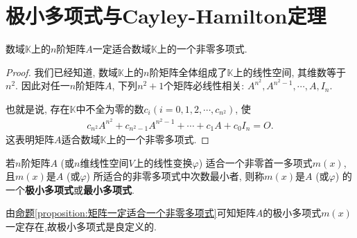 \documentclass[../../main.tex]{subfiles}%
\begin{document}
\section{极小多项式与Cayley-Hamilton定理}

\begin{proposition}\label{proposition:矩阵一定适合一个非零多项式}
数域$\mathbb{K}$上的$n$阶矩阵$A$一定适合数域$\mathbb{K}$上的一个非零多项式.
\end{proposition}
\begin{proof}
我们已经知道, 数域$\mathbb{K}$上的$n$阶矩阵全体组成了$\mathbb{K}$上的线性空间, 其维数等于$n^2$. 因此对任一$n$阶矩阵$A$, 下列$n^2 + 1$个矩阵必线性相关:
$A^{n^2}, A^{n^2-1}, \cdots, A, I_n$.

也就是说, 存在$\mathbb{K}$中不全为零的数$c_i (i = 0, 1, 2, \cdots, c_{n^2})$, 使
\begin{align*}
c_{n^2}A^{n^2} + c_{n^2-1}A^{n^2-1} + \cdots + c_1A + c_0I_n = O.
\end{align*}
这表明矩阵$A$适合数域$\mathbb{K}$上的一个非零多项式.
\end{proof}

\begin{definition}[矩阵的极小多项式]
若$n$阶矩阵$A$ (或$n$维线性空间$V$上的线性变换$\varphi$) 适合一个非零首一多项式$m(x)$, 且$m(x)$是$A$ (或$\varphi$) 所适合的非零多项式中次数最小者, 则称$m(x)$是$A$ (或$\varphi$) 的一个\textbf{极小多项式}或\textbf{最小多项式}.
\end{definition}
\begin{remark}
由\hyperref[proposition:矩阵一定适合一个非零多项式]{命题\ref{proposition:矩阵一定适合一个非零多项式}}可知矩阵$A$的极小多项式$m(x)$一定存在,故极小多项式是良定义的.
\end{remark}
\end{document}
